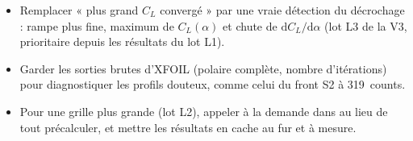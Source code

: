 \begin{pistes}
\begin{itemize}
\item Remplacer « plus grand $C_L$ convergé » par une vraie détection du décrochage : rampe plus fine, maximum de $C_L(\alpha)$ et chute de $\mathrm dC_L/\mathrm d\alpha$ (lot L3 de la V3, prioritaire depuis les résultats du lot L1).
\item Garder les sorties brutes d'XFOIL (polaire complète, nombre d'itérations) pour diagnostiquer les profils douteux, comme celui du front S2 à 319~counts.
\item Pour une grille plus grande (lot L2), appeler  à la demande dans  au lieu de tout précalculer, et mettre les résultats en cache au fur et à mesure.
\end{itemize}
\end{pistes}
